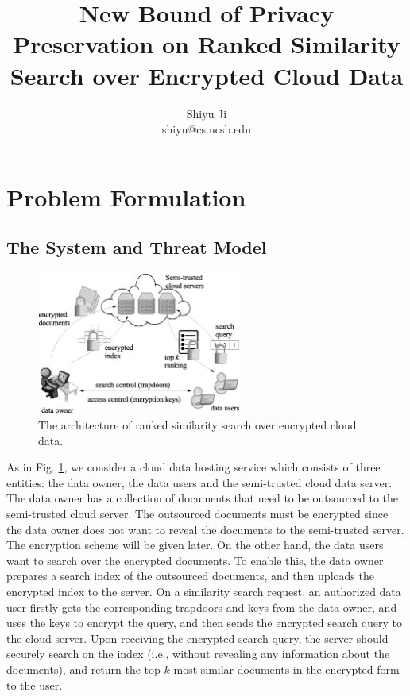 \documentclass{article}
\begin{document}
\title{\Large\bf New Bound of Privacy Preservation on Ranked Similarity Search over Encrypted Cloud Data}
\author{Shiyu Ji\\ shiyu@cs.ucsb.edu}
\date{}
\maketitle

\newtheorem{definition}{Definition}
\theoremstyle{definition}
\newtheorem{theorem}{Theorem}
\theoremstyle{plain}
\newtheorem{lemma}{Lemma}
\theoremstyle{plain}
\newtheorem{corollary}{Corollary}
\theoremstyle{plain}

\section{Problem Formulation}
\subsection{The System and Threat Model}

\begin{figure}
\centering
\includegraphics[width=0.6\textwidth]{system_model.eps}
\caption{The architecture of ranked similarity search over encrypted cloud data.}
\label{fig:system_model}
\end{figure}

As in Fig. \ref{fig:system_model}, we consider a cloud data hosting service which consists of three entities: the data owner, the data users and the semi-trusted cloud data server. The data owner has a collection of documents that need to be outsourced to the semi-trusted cloud server. The outsourced documents must be encrypted since the data owner does not want to reveal the documents to the semi-trusted server. The encryption scheme will be given later. On the other hand, the data users want to search over the encrypted documents. To enable this, the data owner prepares a search index of the outsourced documents, and then uploads the encrypted index to the server. On a similarity search request, an authorized data user firstly gets the corresponding trapdoors and keys from the data owner, and uses the keys to encrypt the query, and then sends the encrypted search query to the cloud server. Upon receiving the encrypted search query, the server should securely search on the index (i.e., without revealing any information about the documents), and return the top $k$ most similar documents in the encrypted form to the user.
\end{document}
